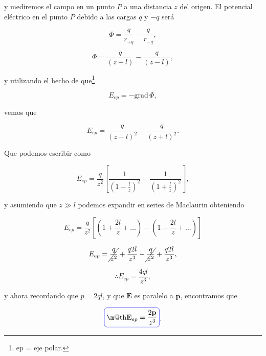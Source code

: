 \documentclass[a4paper,11pt]{article}
\makeatletter
\numberwithin{equation}{section}
\newcommand*{\boxcolor}{blue}
\renewcommand{\boxed}[1]{\textcolor{\boxcolor}{%
\tikz[baseline={([yshift=-1ex]current bounding box.center)}] \node [rectangle, minimum width=1ex,rounded corners,draw] {\normalcolor\m@th$\displaystyle#1$};}}
\makeatother
\begin{document}
y mediremos el campo en un punto $P$ a una distancia $z$ del origen. El potencial 
eléctrico en el punto $P$ debido a las cargas $q$ y $-q$ será 

\begin{equation}
 \Phi = \frac{q}{r_{+q}} - \frac{q}{r_{-q}},
\end{equation}

\begin{equation}
 \Phi = \frac{q}{(z + l)} - \frac{q}{(z - l)},
\end{equation}

y utilizando el hecho de que\footnote{ep = eje polar.} 

\begin{equation}
 E_{ep} = - \text{grad} \, \Phi,
\end{equation}

vemos que 

\begin{equation}
 E_{ep} = \frac{q}{(z - l)^2} - \frac{q}{(z + l)^2}.
\end{equation}

Que podemos escribir como 

\begin{equation}
 E_{ep} = \frac{q}{z^2}\left[\frac{1}{\left(1 - \frac{l}{z}\right)^2} - 
 \frac{1}{\left(1 + \frac{l}{z}\right)^2}\right],
\end{equation}

y asumiendo que $z \gg l$ podemos expandir en series de Maclaurin obteniendo 

\begin{equation}
 E_{ep} = \frac{q}{z^2}\left[\left(1 + \frac{2l}{z} + \dots \right) - 
 \left(1 - \frac{2l}{z} + \dots \right) \right]
\end{equation}

\begin{equation}
 E_{ep} = \cancel{\frac{q}{z^2}} + \frac{q2l}{z^3} - \cancel{\frac{q}{z^2}} +
 \frac{q2l}{z^3},
\end{equation}

\begin{equation}
 \therefore E_{ep} = \frac{4ql}{z^3},
\end{equation}

y ahora recordando que $p = 2ql$, y que $\mathbf{E}$ es paralelo a $\mathbf{p}$, 
encontramos que 

\begin{equation}
 \boxed{\mathbf{E}_{ep} = \frac{2\mathbf{p}}{z^3}}.
\end{equation}
\end{document}
